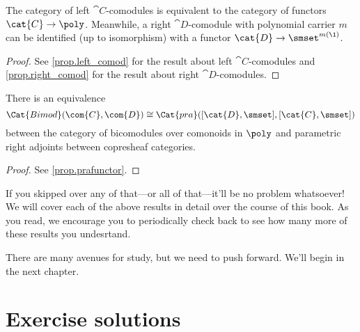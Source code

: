 
\begin{proposition}
    The category of left $\cat{C}$-comodules is equivalent to the category of functors $\cat{C}\to\poly$.
    Meanwhile, a right $\cat{D}$-comodule with polynomial carrier $m$ can be identified (up to isomorphism) with a functor $\cat{D}\to\smset^{m(\1)}$.
\end{proposition}
\begin{proof}
    See \cref{prop.left_comod} for the result about left $\cat{C}$-comodules and \cref{prop.right_comod} for the result about right $\cat{D}$-comodules.
\end{proof}

\begin{proposition}[Garner]
    There is an equivalence
    \[
    \Cat{Bimod}(\com{C},\com{D})\cong\Cat{pra}([\cat{D},\smset],[\cat{C},\smset])
    \]
    between the category of bicomodules over comonoids in $\poly$ and parametric right adjoints between copresheaf categories.
\end{proposition}
\begin{proof}
    See \cref{prop.prafunctor}.
\end{proof}

If you skipped over any of that---or all of that---it'll be no problem whatsoever! We will cover each of the above results in detail over the course of this book. As you read, we encourage you to periodically check back to see how many more of these results you undesrtand.

There are many avenues for study, but we need to push forward.
We'll begin in the next chapter.

\section{Exercise solutions}
{\footnotesize
    }